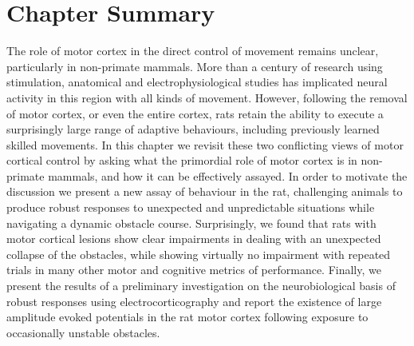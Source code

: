				
\section{Chapter Summary}

The role of motor cortex in the direct control of movement remains unclear, particularly in non-primate mammals. More than a century of research using stimulation, anatomical and electrophysiological studies has implicated neural activity in this region with all kinds of movement. However, following the removal of motor cortex, or even the entire cortex, rats retain the ability to execute a surprisingly large range of adaptive behaviours, including previously learned skilled movements. In this chapter we revisit these two conflicting views of motor cortical control by asking what the primordial role of motor cortex is in non-primate mammals, and how it can be effectively assayed. In order to motivate the discussion we present a new assay of behaviour in the rat, challenging animals to produce robust responses to unexpected and unpredictable situations while navigating a dynamic obstacle course. Surprisingly, we found that rats with motor cortical lesions show clear impairments in dealing with an unexpected collapse of the obstacles, while showing virtually no impairment with repeated trials in many other motor and cognitive metrics of performance. Finally, we present the results of a preliminary investigation on the neurobiological basis of robust responses using electrocorticography and report the existence of large amplitude evoked potentials in the rat motor cortex following exposure to occasionally unstable obstacles.

\pagebreak


